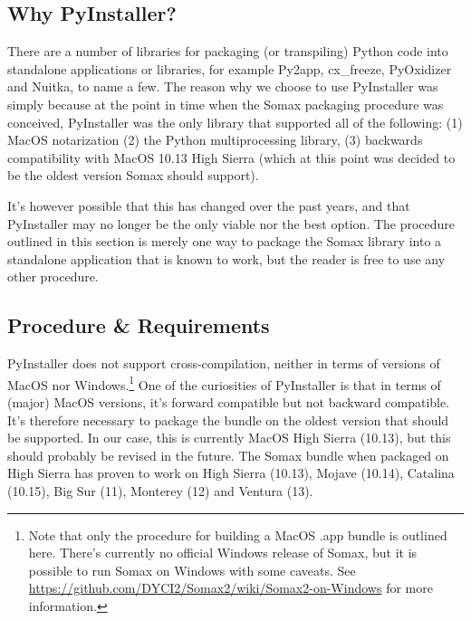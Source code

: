 
\subsection{Why PyInstaller?}\label{ssec:2-why-pyinstaller}
There are a number of libraries for packaging (or transpiling) Python code into standalone applications or libraries, for example Py2app, cx\_freeze, PyOxidizer and Nuitka, to name a few. The reason why we choose to use PyInstaller was simply because at the point in time when the Somax packaging procedure was conceived, PyInstaller was the only library that supported all of the following: (1) MacOS notarization (2) the Python multiprocessing library, (3) backwards compatibility with MacOS 10.13 High Sierra (which at this point was decided to be the oldest version Somax should support). 

It's however possible that this has changed over the past years, and that PyInstaller may no longer be the only viable nor the best option. The procedure outlined in this section is merely one way to package the Somax library into a standalone application that is known to work, but the reader is free to use any other procedure.


\subsection{Procedure \& Requirements}\label{ssec:2-pyinstaller-procedure}

PyInstaller does not support cross-compilation, neither in terms of versions of MacOS nor Windows.\footnote{Note that only the procedure for building a MacOS .app bundle is outlined here. There's currently no official Windows release of Somax, but it is possible to run Somax on Windows with some caveats. See \url{https://github.com/DYCI2/Somax2/wiki/Somax2-on-Windows} for more information.} One of the curiosities of PyInstaller is that in terms of (major) MacOS versions, it's forward compatible but not backward compatible. It's therefore necessary to package the bundle on the oldest version that should be supported. In our case, this is currently MacOS High Sierra (10.13), but this should probably be revised in the future. The Somax bundle when packaged on High Sierra has proven to work on High Sierra (10.13), Mojave (10.14), Catalina (10.15), Big Sur (11), Monterey (12) and Ventura (13). 


